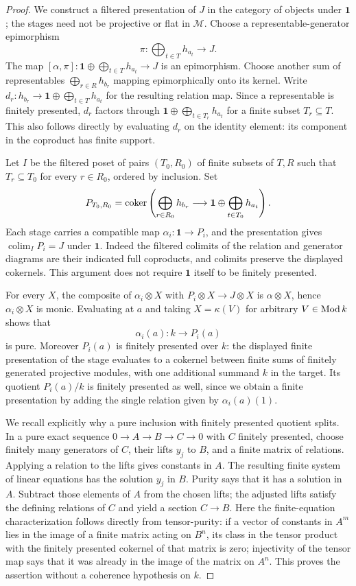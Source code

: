 \begin{proof}
We construct a filtered presentation of $J$ in the category of objects under $\mathbf1$; the stages need not be projective or flat in $\mathcal M$. Choose a representable-generator epimorphism
\[
 \pi:\bigoplus_{t\in T}h_{a_t}\longrightarrow J.
\]
The map $[\alpha,\pi]:\mathbf1\oplus\bigoplus_{t\in T}h_{a_t}\to J$ is an epimorphism. Choose another sum of representables $\bigoplus_{r\in R}h_{b_r}$ mapping epimorphically onto its kernel. Write $d_r:h_{b_r}\to\mathbf1\oplus\bigoplus_{t\in T}h_{a_t}$ for the resulting relation map. Since a representable is finitely presented, $d_r$ factors through $\mathbf1\oplus\bigoplus_{t\in T_r}h_{a_t}$ for a finite subset $T_r\subseteq T$. This also follows directly by evaluating $d_r$ on the identity element: its component in the coproduct has finite support.

Let $I$ be the filtered poset of pairs $(T_0,R_0)$ of finite subsets of $T,R$ such that $T_r\subseteq T_0$ for every $r\in R_0$, ordered by inclusion. Set
\[
 P_{T_0,R_0}=\operatorname{coker}\left(
 \bigoplus_{r\in R_0}h_{b_r}\longrightarrow
 \mathbf1\oplus\bigoplus_{t\in T_0}h_{a_t}\right).
\]
Each stage carries a compatible map $\alpha_i:\mathbf1\to P_i$, and the presentation gives $\operatorname{colim}_I P_i=J$ under $\mathbf1$. Indeed the filtered colimits of the relation and generator diagrams are their indicated full coproducts, and colimits preserve the displayed cokernels. This argument does not require $\mathbf1$ itself to be finitely presented.

For every $X$, the composite of $\alpha_i\otimes X$ with $P_i\otimes X\to J\otimes X$ is $\alpha\otimes X$, hence $\alpha_i\otimes X$ is monic. Evaluating at $a$ and taking $X=\kappa(V)$ for arbitrary $V\in\operatorname{Mod} k$ shows that
\[
 \alpha_i(a):k\longrightarrow P_i(a)
\]
is pure. Moreover $P_i(a)$ is finitely presented over $k$: the displayed finite presentation of the stage evaluates to a cokernel between finite sums of finitely generated projective modules, with one additional summand $k$ in the target. Its quotient $P_i(a)/k$ is finitely presented as well, since we obtain a finite presentation by adding the single relation given by $\alpha_i(a)(1)$.

We recall explicitly why a pure inclusion with finitely presented quotient splits. In a pure exact sequence $0\to A\to B\to C\to0$ with $C$ finitely presented, choose finitely many generators of $C$, their lifts $y_j$ to $B$, and a finite matrix of relations. Applying a relation to the lifts gives constants in $A$. The resulting finite system of linear equations has the solution $y_j$ in $B$. Purity says that it has a solution in $A$. Subtract those elements of $A$ from the chosen lifts; the adjusted lifts satisfy the defining relations of $C$ and yield a section $C\to B$. Here the finite-equation characterization follows directly from tensor-purity: if a vector of constants in $A^m$ lies in the image of a finite matrix acting on $B^n$, its class in the tensor product with the finitely presented cokernel of that matrix is zero; injectivity of the tensor map says that it was already in the image of the matrix on $A^n$. This proves the assertion without a coherence hypothesis on $k$.


\end{proof}
